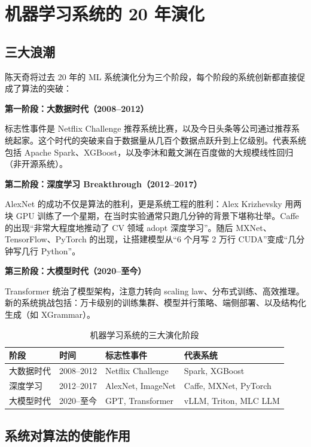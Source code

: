 \section{机器学习系统的 20 年演化}

\subsection{三大浪潮}

陈天奇将过去 20 年的 ML 系统演化分为三个阶段，每个阶段的系统创新都直接促成了算法的突破：

\textbf{第一阶段：大数据时代（2008--2012）}

标志性事件是 Netflix Challenge 推荐系统比赛，以及今日头条等公司通过推荐系统起家。这个时代的突破来自于数据量从几百个数据点跃升到上亿级别。代表系统包括 Apache Spark、XGBoost，以及李沐和戴文渊在百度做的大规模线性回归（非开源系统）。

\textbf{第二阶段：深度学习 Breakthrough（2012--2017）}

AlexNet 的成功不仅是算法的胜利，更是系统工程的胜利：Alex Krizhevsky 用两块 GPU 训练了一个星期，在当时实验通常只跑几分钟的背景下堪称壮举。Caffe 的出现``非常大程度地推动了 CV 领域 adopt 深度学习''。随后 MXNet、TensorFlow、PyTorch 的出现，让搭建模型从``6 个月写 2 万行 CUDA''变成``几分钟写几行 Python''。

\textbf{第三阶段：大模型时代（2020--至今）}

Transformer 统治了模型架构，注意力转向 scaling law、分布式训练、高效推理。新的系统挑战包括：万卡级别的训练集群、模型并行策略、端侧部署、以及结构化生成（如 XGrammar）。

\begin{table}[H]
\centering
\begin{tabular}{p{2.5cm}p{3cm}p{3cm}p{4cm}}
\toprule
\textbf{阶段} & \textbf{时间} & \textbf{标志性事件} & \textbf{代表系统} \\
\midrule
大数据时代 & 2008--2012 & Netflix Challenge & Spark, XGBoost \\
深度学习 & 2012--2017 & AlexNet, ImageNet & Caffe, MXNet, PyTorch \\
大模型时代 & 2020--至今 & GPT, Transformer & vLLM, Triton, MLC LLM \\
\bottomrule
\end{tabular}
\caption{机器学习系统的三大演化阶段}
\end{table}

\subsection{系统对算法的使能作用}

